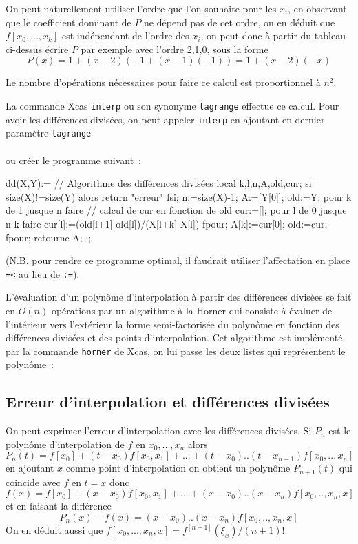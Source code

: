 \documentclass[a4paper,11pt]{book}
\begin{document}
\begin{giacjshere}
On peut naturellement utiliser l'ordre que l'on souhaite pour les
$x_i$, en observant que le coefficient dominant de $P$ ne d\'epend pas de
cet ordre, on en d\'eduit que $f[x_0,...,x_k]$ est ind\'ependant de
l'ordre des $x_i$, on peut donc \`a partir du tableau ci-dessus
\'ecrire $P$ par exemple avec l'ordre 2,1,0, sous la forme
\[ P(x)=1+(x-2)(-1+(x-1)(-1))=1+(x-2)(-x)\]

Le nombre d'op\'erations n\'ecessaires pour faire ce calcul est
proportionnel \`a $n^2$.

La commande Xcas \verb|interp| ou son synonyme \verb|lagrange|
effectue ce calcul. Pour avoir les diff\'erences divis\'ees, 
on peut appeler \verb|interp| en ajoutant en dernier
param\`etre \verb|lagrange| \\
\\
ou cr\'eer le programme suivant~:
\begin{giacprog}
dd(X,Y):={ // Algorithme des différences divisées
  local k,l,n,A,old,cur;
  si size(X)!=size(Y) alors return "erreur" fsi;
  n:=size(X)-1;
  A:=[Y[0]];
  old:=Y;
  pour k de 1 jusque n faire
    // calcul de cur en fonction de old
    cur:=[];
    pour l de 0 jusque n-k faire
      cur[l]:=(old[l+1]-old[l])/(X[l+k]-X[l])
    fpour;
    A[k]:=cur[0];
    old:=cur;
  fpour;
  retourne A;
}:;
\end{giacprog}
(N.B. pour rendre ce programme optimal, il faudrait utiliser
l'affectation en place \verb|=<| au lieu de \verb|:=|).

L'\'evaluation d'un polyn\^ome d'interpolation \`a partir des diff\'erences
divis\'ees se fait en $O(n)$ op\'erations
par un algorithme \`a la Horner qui consiste \`a \'evaluer
de l'int\'erieur vers l'ext\'erieur la forme semi-factoris\'ee
du polyn\^ome en fonction des diff\'erences divis\'ees et
des points d'interpolation. Cet algorithme est impl\'ement\'e
par la commande \verb|horner| 
de Xcas, on lui passe les deux listes 
qui repr\'esentent le polyn\^ome~:\\

\subsection{Erreur d'interpolation et diff\'erences divis\'ees}
On peut exprimer l'erreur d'interpolation
avec les diff\'erences divis\'ees. Si $P_n$ est le polyn\^ome
d'interpolation de $f$ en $x_0,...,x_n$ alors
$$ P_n(t)=f[x_0]+ (t-x_0)f[x_0,x_1]+...+(t-x_0)..(t-x_{n-1})f[x_0,..,x_n]$$
en ajoutant $x$ comme point d'interpolation on obtient un polyn\^ome
$P_{n+1}(t)$ qui coincide avec $f$ en $t=x$ donc
\begin{equation} \label{eq:fdd}
 f(x)=f[x_0]+ (x-x_0)f[x_0,x_1]+...+(x-x_0)..(x-x_{n})f[x_0,..,x_n,x]
\end{equation}
et en faisant la diff\'erence
\begin{equation} \label{eq:errinterpdd}
P_n(x)-f(x)=(x-x_0)..(x-x_{n})f[x_0,..,x_n,x]
\end{equation}
On en d\'eduit aussi que $f[x_0,...,x_n,x]=f^{[n+1]}(\xi_x)/(n+1)!$.


\end{giacjshere}
\end{document}
